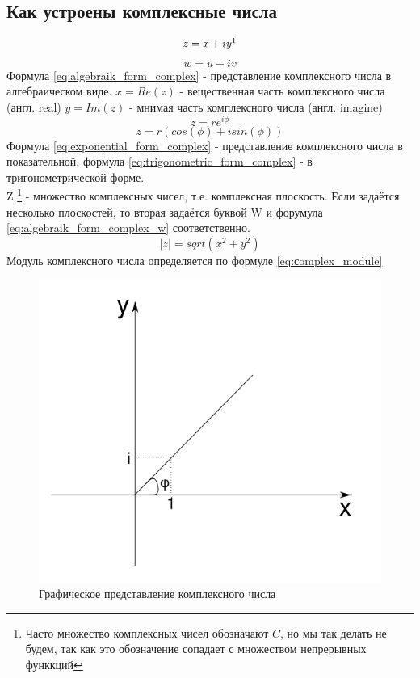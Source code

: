 \documentclass{article}
\begin{document}
        \subsection{Как устроены комплексные числа}
            \begin{equation}\label{eq:algebraik_form_complex}
                z=x+iy\footnotemark
            \end{equation}
            \begin{equation}\label{eq:algebraik_form_complex_w}
                w=u+iv
            \end{equation}
            Формула \ref{eq:algebraik_form_complex} - представление комплексного числа в алгебраическом виде. $x=Re(z)$ - вещественная часть комплексного числа (англ. real) $y=Im(z)$ - мнимая часть комплексного числа (англ. imagine)\\
            \begin{equation}\label{eq:exponential_form_complex}
                z=re^{i\phi}
            \end{equation}
            \begin{equation}\label{eq:trigonometric_form_complex}
                z=r(cos(\phi)+i sin(\phi))
            \end{equation}
          Формула \ref{eq:exponential_form_complex} - представление комплексного числа в показательной, формула         \ref{eq:trigonometric_form_complex} - в тригонометрической форме.\\
            Z \footnote{Часто множество комплексных чисел обозначают $C$, но мы так делать не будем, так как это обозначение сопадает с множеством непрерывных функкций} - множество комплексных чисел, т.е. комплексная плоскость. Если задаётся несколько плоскостей, то вторая задаётся буквой W и форумула \ref{eq:algebraik_form_complex_w} соответственно.
            \begin{equation}\label{eq:сomplex_module}
                |z|=sqrt(x^2+y^2)
            \end{equation}
            Модуль комплексного числа определяется по формуле \ref{eq:сomplex_module}
            \begin{figure}[h]
                \includegraphics[width=0.6\linewidth]{complex_example}
                \caption{Графическое представление комплексного числа}
                \label{ris:complex_example}
            \end{figure}
\end{document}
